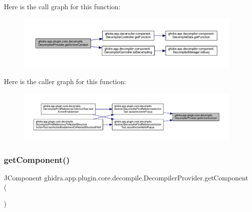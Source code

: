 Here is the call graph for this function\+:
\nopagebreak
\begin{figure}[H]
\begin{center}
\leavevmode
\includegraphics[width=350pt]{classghidra_1_1app_1_1plugin_1_1core_1_1decompile_1_1_decompiler_provider_ab571e99016e4543a5b2d4992f524b239_cgraph}
\end{center}
\end{figure}
Here is the caller graph for this function\+:
\nopagebreak
\begin{figure}[H]
\begin{center}
\leavevmode
\includegraphics[width=350pt]{classghidra_1_1app_1_1plugin_1_1core_1_1decompile_1_1_decompiler_provider_ab571e99016e4543a5b2d4992f524b239_icgraph}
\end{center}
\end{figure}
\mbox{\label{classghidra_1_1app_1_1plugin_1_1core_1_1decompile_1_1_decompiler_provider_a3a62ac0c1d62e3ce2999b5873f369105}} 
\subsubsection{\texorpdfstring{getComponent()}{getComponent()}}
{\footnotesize\ttfamily J\+Component ghidra.\+app.\+plugin.\+core.\+decompile.\+Decompiler\+Provider.\+get\+Component (\begin{DoxyParamCaption}{ }\end{DoxyParamCaption})\hspace{0.3cm}{\ttfamily [inline]}}



